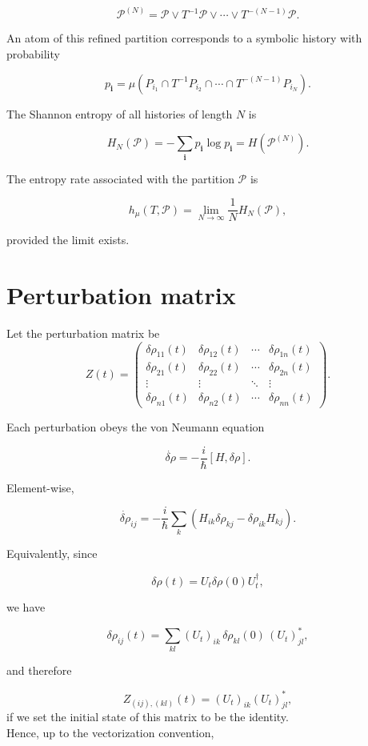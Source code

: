 \documentclass{article}
\begin{document}
$$
\mathcal P^{(N)}
=
\mathcal P
\vee T^{-1}\mathcal P
\vee\cdots\vee
T^{-(N-1)}\mathcal P.
$$

An atom of this refined partition corresponds to a symbolic history with probability

$$
p_{\mathbf i}
=
\mu\!\left(
P_{i_1}
\cap
T^{-1}P_{i_2}
\cap\cdots\cap
T^{-(N-1)}P_{i_N}
\right).
$$

The Shannon entropy of all histories of length $N$ is

$$
H_N(\mathcal P)
=
-\sum_{\mathbf i}
p_{\mathbf i}\log p_{\mathbf i}
=
H\!\left(\mathcal P^{(N)}\right).
$$

The entropy rate associated with the partition $\mathcal P$ is

$$
h_\mu(T,\mathcal P)
=
\lim_{N\rightarrow\infty}
\frac{1}{N}
H_N(\mathcal P),
$$

provided the limit exists. \\

\section{Perturbation matrix}
Let the perturbation matrix be
\[
Z(t)=
\begin{pmatrix}
\delta\rho_{11}(t) & \delta\rho_{12}(t) & \cdots & \delta\rho_{1n}(t)\\
\delta\rho_{21}(t) & \delta\rho_{22}(t) & \cdots & \delta\rho_{2n}(t)\\
\vdots & \vdots & \ddots & \vdots\\
\delta\rho_{n1}(t) & \delta\rho_{n2}(t) & \cdots & \delta\rho_{nn}(t)
\end{pmatrix}.
\]

Each perturbation obeys the von Neumann equation

$$
\dot{\delta\rho}
=
-\frac{i}{\hbar}[H,\delta\rho].
$$

Element-wise,

$$
\dot{\delta\rho}_{ij}
=
-\frac{i}{\hbar}
\sum_k
\left(
H_{ik}\delta\rho_{kj}
-
\delta\rho_{ik}H_{kj}
\right).
$$

Equivalently, since

$$
\delta\rho(t)=U_t\delta\rho(0)U_t^\dagger,
$$

we have

$$
\delta\rho_{ij}(t)
=
\sum_{kl}
(U_t)_{ik}\,
\delta\rho_{kl}(0)\,
(U_t)^*_{jl},
$$

and therefore

$$
Z_{(ij),(kl)}(t)
=
(U_t)_{ik}(U_t)^*_{jl},
$$
if we set the initial state of this matrix to be the identity.\\
Hence, up to the vectorization convention,
\end{document}
